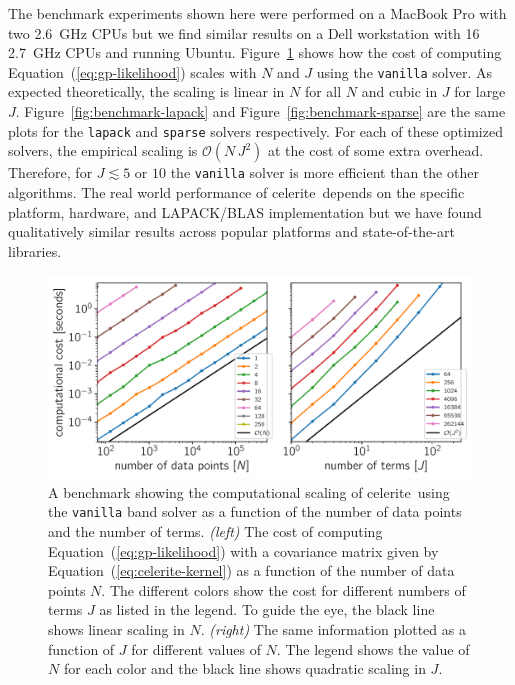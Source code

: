 \documentclass[manuscript, letterpaper]{aastex6}
\newcommand{\project}[1]{\textsf{#1}}
\newcommand{\celerite}{\project{celerite}}
\newcommand{\figureref}[1]{\ref{fig:#1}}
\newcommand{\Figure}[1]{Figure~\figureref{#1}}
\newcommand{\figurelabel}[1]{\label{fig:#1}}
\renewcommand{\eqref}[1]{\ref{eq:#1}}
\newcommand{\Eq}[1]{Equation~(\eqref{#1})}
\newcommand{\eq}[1]{\Eq{#1}}
\begin{document}
The benchmark experiments shown here were performed on a MacBook Pro with two
2.6~GHz CPUs but we find similar results on a Dell workstation with 16 2.7~GHz
CPUs and running Ubuntu.
\Figure{benchmark} shows how the cost of computing \eq{gp-likelihood} scales
with $N$ and $J$ using the \texttt{vanilla} solver.
As expected theoretically, the scaling is linear in $N$ for all $N$ and cubic
in $J$ for large $J$.
\Figure{benchmark-lapack} and \Figure{benchmark-sparse} are the same plots for
the \texttt{lapack} and \texttt{sparse} solvers respectively.
For each of these optimized solvers, the empirical scaling is
$\mathcal{O}(N\,J^2)$ at the cost of some extra overhead.
Therefore, for $J \lesssim 5$ or $10$ the \texttt{vanilla} solver is more
efficient than the other algorithms.
The real world performance of \celerite\ depends on the specific platform,
hardware, and \project{LAPACK}/\project{BLAS} implementation but we have found
qualitatively similar results across popular platforms and state-of-the-art
libraries.

\begin{figure}[tp]
\begin{center}
\includegraphics[width=\textwidth]{figures/benchmark_darwin.pdf}
\caption{A benchmark showing the computational scaling of \celerite\ using the
    \texttt{vanilla} band solver as a function of the number of data points
    and the number of terms.
    \emph{(left)} The cost of computing \eq{gp-likelihood} with a covariance
    matrix given by \eq{celerite-kernel} as a function of the number of data
    points $N$.
    The different colors show the cost for different numbers of terms $J$ as
    listed in the legend.
    To guide the eye, the black line shows linear scaling in $N$.
    \emph{(right)} The same information plotted as a function of $J$ for
    different values of $N$.
    The legend shows the value of $N$ for each color and the black line shows
    quadratic scaling in $J$.
    \figurelabel{benchmark}}
\end{center}
\end{figure}
\end{document}

